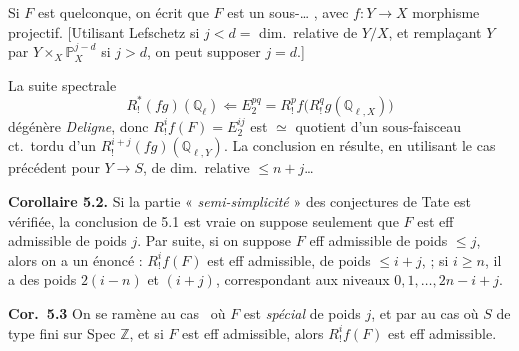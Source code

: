 \documentclass[11pt,a4paper]{article}
\begin{document}

Si $F$ est quelconque, on écrit que $F$ est un sous-…
  
, avec $f : Y \to X$
morphisme projectif. [Utilisant Lefschetz    si $j < d =$ dim.\ relative de
$Y/X$, et remplaçant $Y$ par $Y \times_{X} \mathbb{P}^{j-d}_{X}$ si
$j > d$, on peut supposer $j = d$.]

La suite spectrale
\[
R^{*}_{!}(fg)(\mathbb{Q}_{\ell}) \Longleftarrow E_{2}^{pq} =
R^{p}_{!}f\bigl(R^{q}_{!}g(\mathbb{Q}_{\ell,X})\bigr)
\]
dégénère  \emph{Deligne}, donc
$R^{i}_{!}f(F) = E_{2}^{ij}$ est $\simeq$ quotient  d'un
sous-faisceau ct.\ tordu d'un $R^{i+j}_{!}(fg)(\mathbb{Q}_{\ell,Y})$.
La conclusion en résulte, en utilisant le cas précédent pour $Y \to S$, de
dim.\ relative $\leqslant n + j$…

\textbf{Corollaire 5.2.} Si la partie « \emph{semi-simplicité} » des
conjectures de Tate est vérifiée, la conclusion de 5.1 est vraie
 on suppose seulement que $F$ est eff admissible de poids
$j$. Par suite, si on suppose $F$ eff admissible de poids
$\leqslant j$, alors on a un énoncé : $R^{i}_{!}f(F)$ est eff
admissible, de poids \struck{\ill{}} $\leqslant i+j$,  ; si $i \geqslant n$, il a des
\struck{\ill{}} poids  $2(i-n)$ et $(i+j)$, correspondant
aux niveaux $0, 1, \ldots, 2n-i+j$.

\textbf{Cor.\ 5.3}  On se ramène au cas
\ où $F$ est \emph{spécial} de poids $j$, et par
 au cas où $S$ de type fini sur Spec
$\mathbb{Z}$, et \struck{\ill{}} si $F$ est eff admissible, alors
$R^{i}_{!}f(F)$ est eff admissible.
\end{document}
